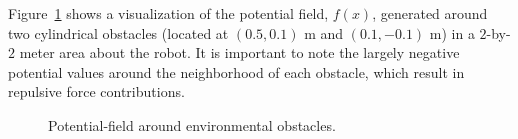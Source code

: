 			Figure~\ref{fig::potential_field} shows a visualization of the potential field, $f(x)$, generated around two cylindrical obstacles (located at $(0.5,0.1)\text{ m}$ and $(0.1,-0.1)\text{ m}$) in a $2$-by-$2$ meter area about the robot. It is important to note the largely negative potential values around the neighborhood of each obstacle, which result in repulsive force contributions.
				\begin{figure}[t!]
					\centering
					\caption{Potential-field around environmental obstacles.}
					\label{fig::potential_field}
				\end{figure}


